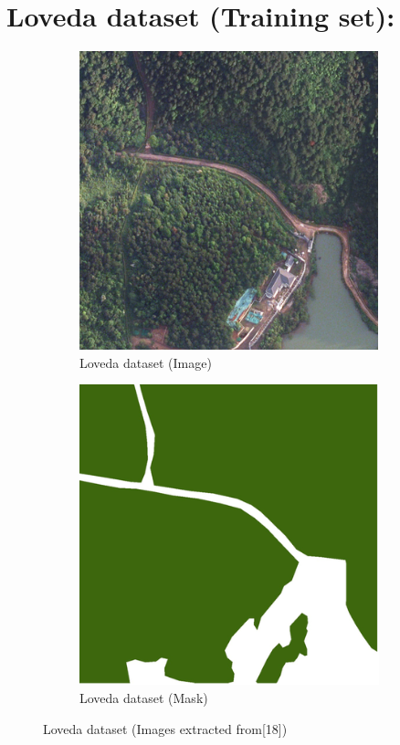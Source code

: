 \section{Loveda dataset (Training set):}
 \begin{figure}[H]
\centering
\begin{subfigure}{0.49\textwidth}
\centering
\includegraphics[width = \textwidth]{IMAGENES/IMG12-lov-IMG.PNG}
\caption{Loveda dataset (Image)}
\label{fig:left}
\end{subfigure}
\begin{subfigure}{0.49\textwidth}
\centering
\includegraphics[width = \textwidth]{IMAGENES/IMG12-lov-MASK.PNG}
\caption{Loveda dataset (Mask)}
\label{fig:right}
\end{subfigure}
\caption{Loveda dataset (Images extracted from[18])}
\label{fig:combined}
\end{figure}

